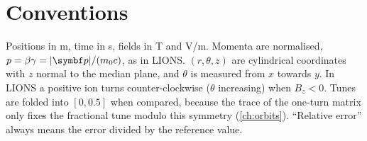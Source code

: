 \section*{Conventions}
Positions in \si{m}, time in \si{s}, fields in \si{T} and \si{V/m}.
Momenta are normalised, $p = \beta\gamma = |\vect p|/(m_0 c)$, as in LIONS.
$(r,\theta,z)$ are cylindrical coordinates with $z$ normal to the median plane, and $\theta$ is measured from $x$ towards $y$.
In LIONS a positive ion turns counter-clockwise ($\theta$ increasing) when $B_z<0$.
Tunes are folded into $[0,0.5]$ when compared, because the trace of the one-turn matrix only fixes the fractional
tune modulo this symmetry (\cref{ch:orbits}).
``Relative error'' always means the error divided by the reference value.
